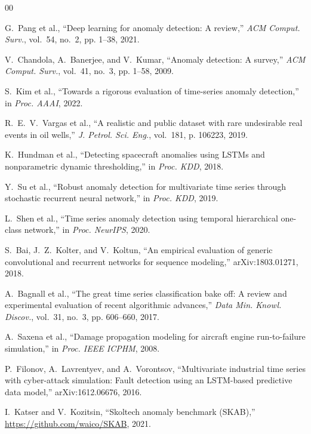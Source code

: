 \documentclass[conference]{IEEEtran}
\begin{document}
\begin{thebibliography}{00}

G.~Pang et al.,
``Deep learning for anomaly detection: A review,''
\textit{ACM Comput. Surv.}, vol.~54, no.~2, pp. 1--38, 2021.

V.~Chandola, A.~Banerjee, and V.~Kumar,
``Anomaly detection: A survey,''
\textit{ACM Comput. Surv.}, vol.~41, no.~3, pp. 1--58, 2009.

S.~Kim et al.,
``Towards a rigorous evaluation of time-series anomaly detection,''
in \textit{Proc. AAAI}, 2022.

R.~E.~V.~Vargas et al.,
``A realistic and public dataset with rare undesirable real events in oil wells,''
\textit{J. Petrol. Sci. Eng.}, vol.~181, p. 106223, 2019.

K.~Hundman et al.,
``Detecting spacecraft anomalies using LSTMs and nonparametric dynamic
thresholding,''
in \textit{Proc. KDD}, 2018.

Y.~Su et al.,
``Robust anomaly detection for multivariate time series through stochastic
recurrent neural network,''
in \textit{Proc. KDD}, 2019.

L.~Shen et al.,
``Time series anomaly detection using temporal hierarchical one-class
network,''
in \textit{Proc. NeurIPS}, 2020.

S.~Bai, J.~Z.~Kolter, and V.~Koltun,
``An empirical evaluation of generic convolutional and recurrent networks
for sequence modeling,''
arXiv:1803.01271, 2018.

A.~Bagnall et al.,
``The great time series classification bake off: A review and experimental
evaluation of recent algorithmic advances,''
\textit{Data Min. Knowl. Discov.}, vol.~31, no.~3, pp. 606--660, 2017.

A.~Saxena et al.,
``Damage propagation modeling for aircraft engine run-to-failure simulation,''
in \textit{Proc. IEEE ICPHM}, 2008.

P.~Filonov, A.~Lavrentyev, and A.~Vorontsov,
``Multivariate industrial time series with cyber-attack simulation:
Fault detection using an LSTM-based predictive data model,''
arXiv:1612.06676, 2016.

I.~Katser and V.~Kozitsin,
``Skoltech anomaly benchmark (SKAB),''
\url{https://github.com/waico/SKAB}, 2021.


\end{thebibliography}
\end{document}
